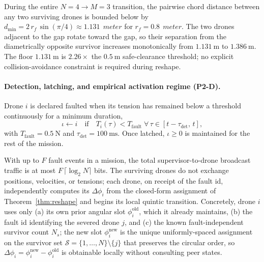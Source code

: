 \begin{proposition}
\label{prop:min-chord}
During the entire $N = 4 \to M = 3$ transition, the pairwise chord distance between any two surviving drones is bounded below by $d_{\min} = 2\,r_f\,\sin(\pi/4) \approx \SI{1.131}{\ meter}$ for $r_f = \SI{0.8}{\ meter}$. The two drones adjacent to the gap rotate toward the gap, so their separation from the diametrically opposite survivor increases monotonically from $\SI{1.131}{\metre}$ to $\SI{1.386}{\metre}$. The floor $\SI{1.131}{\metre}$ is $2.26\times$ the $\SI{0.5}{\metre}$ safe-clearance threshold; no explicit collision-avoidance constraint is required during reshape.
\end{proposition}

\paragraph{Detection, latching, and empirical activation regime (P2-D).} Drone $i$ is declared faulted when its tension has remained below a threshold continuously for a minimum duration,
\begin{equation}
  \iota \leftarrow i\quad\text{if}\quad
    T_i(\tau) < T_{\mathrm{fault}}
    \;\forall\,\tau \in [t - \tau_{\mathrm{det}},\, t],
  \label{eq:detector}
\end{equation}
with $T_{\mathrm{fault}} = \SI{0.5}{\newton}$ and $\tau_{\mathrm{det}} = \SI{100}{\milli\second}$. Once latched, $\iota \ge 0$ is maintained for the rest of the mission.

\begin{proposition}
\label{prop:decent-budget}
With up to $F$ fault events in a mission, the total supervisor-to-drone broadcast traffic is at most $F\,\lceil \log_2 N \rceil$ bits. The surviving drones do not exchange positions, velocities, or tensions; each drone, on receipt of the fault id, independently computes its $\Delta\phi_i$ from the closed-form assignment of Theorem~\ref{thm:reshape} and begins its local quintic transition. Concretely, drone $i$ uses only (a) its own prior angular slot $\phi_i^{\mathrm{old}}$, which it already maintains, (b) the fault id identifying the severed drone $j$, and (c) the known fault-independent survivor count $N_s$; the new slot $\phi_i^{\mathrm{new}}$ is the unique uniformly-spaced assignment on the survivor set $\mathcal{S} = \{1,\ldots, N\} \setminus \{j\}$ that preserves the circular order, so $\Delta\phi_i = \phi_i^{\mathrm{new}} - \phi_i^{\mathrm{old}}$ is obtainable locally without consulting peer states.
\end{proposition}

